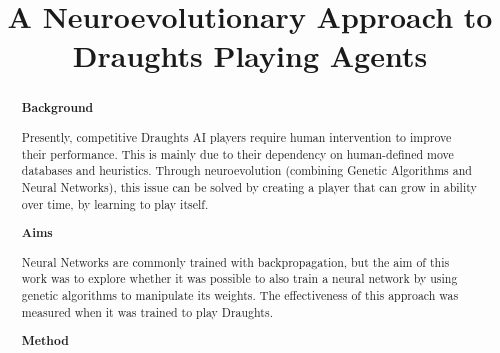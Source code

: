 \documentclass[12pt,a4paper]{article}
\title{A Neuroevolutionary Approach to Draughts Playing Agents}
\author{}
\date{}
\begin{document}
    \maketitle


\begin{abstract}


    {\bf Background}

    Presently, competitive Draughts AI players require human intervention to improve their performance. This is mainly due to their dependency on human-defined move databases and heuristics. Through neuroevolution (combining Genetic Algorithms and Neural Networks), this issue can be solved by creating a player that can grow in ability over time, by learning to play itself.
    
    {\bf Aims}

    Neural Networks are commonly trained with backpropagation, but the aim of this work was to explore whether it was possible to also train a neural network by using genetic algorithms to manipulate its weights. The effectiveness of this approach was measured when it was trained to play Draughts.

    {\bf Method}


\end{abstract}
\end{document}
